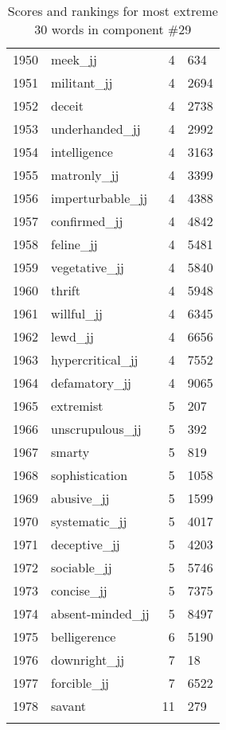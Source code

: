 \begin{longtable}[!htbp]{| rlr@{.}l |}
    1950 & meek\_jj & 4 & 634 \\
    1951 & militant\_jj & 4 & 2694 \\
    1952 & deceit & 4 & 2738 \\
    1953 & underhanded\_jj & 4 & 2992 \\
    1954 & intelligence & 4 & 3163 \\
    1955 & matronly\_jj & 4 & 3399 \\
    1956 & imperturbable\_jj & 4 & 4388 \\
    1957 & confirmed\_jj & 4 & 4842 \\
    1958 & feline\_jj & 4 & 5481 \\
    1959 & vegetative\_jj & 4 & 5840 \\
    1960 & thrift & 4 & 5948 \\
    1961 & willful\_jj & 4 & 6345 \\
    1962 & lewd\_jj & 4 & 6656 \\
    1963 & hypercritical\_jj & 4 & 7552 \\
    1964 & defamatory\_jj & 4 & 9065 \\
    1965 & extremist & 5 & 207 \\
    1966 & unscrupulous\_jj & 5 & 392 \\
    1967 & smarty & 5 & 819 \\
    1968 & sophistication & 5 & 1058 \\
    1969 & abusive\_jj & 5 & 1599 \\
    1970 & systematic\_jj & 5 & 4017 \\
    1971 & deceptive\_jj & 5 & 4203 \\
    1972 & sociable\_jj & 5 & 5746 \\
    1973 & concise\_jj & 5 & 7375 \\
    1974 & absent-minded\_jj & 5 & 8497 \\
    1975 & belligerence & 6 & 5190 \\
    1976 & downright\_jj & 7 & 18 \\
    1977 & forcible\_jj & 7 & 6522 \\
    1978 & savant & 11 & 279 \\
    \hline
    \caption{Scores and rankings for most extreme 30 words in component \#29} \\
\end{longtable}
